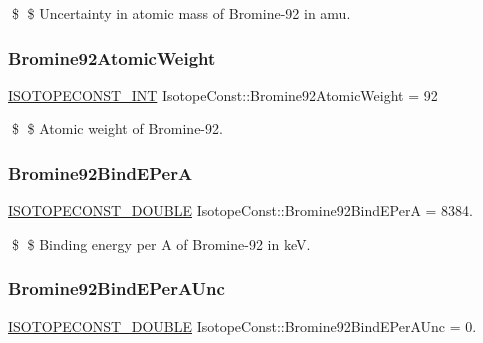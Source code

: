 \$ \$ Uncertainty in atomic mass of Bromine-\/92 in amu. \mbox{\label{group___isotope_const-_bromine-_br92_ga7cf7bb2a1ca628f37098c93dd0e0409b}} 
\subsubsection{\texorpdfstring{Bromine92\+Atomic\+Weight}{Bromine92AtomicWeight}}
{\footnotesize\ttfamily \mbox{\hyperlink{group___isotope_const-_macros_ga5f18360b3e99483a35c32d789e62621c}{I\+S\+O\+T\+O\+P\+E\+C\+O\+N\+S\+T\+\_\+\+I\+NT}} Isotope\+Const\+::\+Bromine92\+Atomic\+Weight = 92}

\$ \$ Atomic weight of Bromine-\/92. \mbox{\label{group___isotope_const-_bromine-_br92_ga1220db825b913a487ac33087734d745d}} 
\subsubsection{\texorpdfstring{Bromine92\+Bind\+E\+PerA}{Bromine92BindEPerA}}
{\footnotesize\ttfamily \mbox{\hyperlink{group___isotope_const-_macros_ga8f45a7272ce02c0b4c65c44636ed719a}{I\+S\+O\+T\+O\+P\+E\+C\+O\+N\+S\+T\+\_\+\+D\+O\+U\+B\+LE}} Isotope\+Const\+::\+Bromine92\+Bind\+E\+PerA = 8384.}

\$ \$ Binding energy per A of Bromine-\/92 in keV. \mbox{\label{group___isotope_const-_bromine-_br92_gabe39c3ff207f02f02f29f750dec25280}} 
\subsubsection{\texorpdfstring{Bromine92\+Bind\+E\+Per\+A\+Unc}{Bromine92BindEPerAUnc}}
{\footnotesize\ttfamily \mbox{\hyperlink{group___isotope_const-_macros_ga8f45a7272ce02c0b4c65c44636ed719a}{I\+S\+O\+T\+O\+P\+E\+C\+O\+N\+S\+T\+\_\+\+D\+O\+U\+B\+LE}} Isotope\+Const\+::\+Bromine92\+Bind\+E\+Per\+A\+Unc = 0.}

